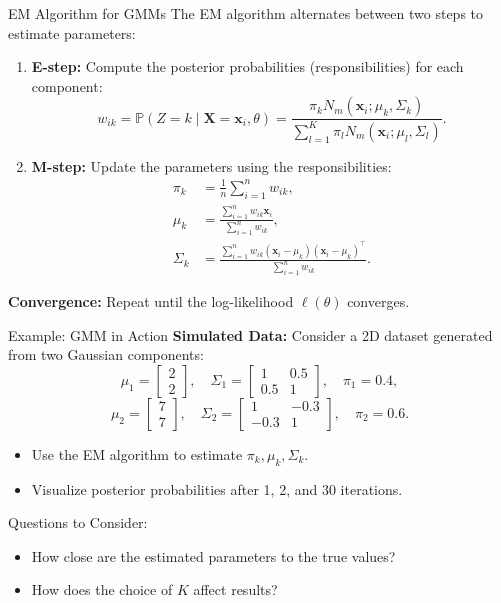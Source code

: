 \documentclass[11pt,handout,aspectratio=169]{beamer}
\begin{document}
\begin{frame}{EM Algorithm for GMMs}
The EM algorithm alternates between two steps to estimate parameters:
\begin{enumerate}
    \item \textbf{E-step:} Compute the posterior probabilities (responsibilities) for each component:
    \[
    w_{ik} = \mathbb{P}(Z = k \mid \mathbf{X} = \mathbf{x}_i, \theta) = 
    \frac{\pi_k N_m(\mathbf{x}_i; \mu_k, \Sigma_k)}{\sum_{l=1}^K \pi_l N_m(\mathbf{x}_i; \mu_l, \Sigma_l)}.
    \]

    \item \textbf{M-step:} Update the parameters using the responsibilities:
    \begin{align*}
        \pi_k &= \frac{1}{n} \sum_{i=1}^n w_{ik}, \\
        \mu_k &= \frac{\sum_{i=1}^n w_{ik} \mathbf{x}_i}{\sum_{i=1}^n w_{ik}}, \\
        \Sigma_k &= \frac{\sum_{i=1}^n w_{ik} (\mathbf{x}_i - \mu_k)(\mathbf{x}_i - \mu_k)^\top}{\sum_{i=1}^n w_{ik}}.
    \end{align*}
\end{enumerate}

\textbf{Convergence:} Repeat until the log-likelihood \( \ell(\theta) \) converges.
\end{frame}

\begin{frame}{Example: GMM in Action}
\textbf{Simulated Data:} Consider a 2D dataset generated from two Gaussian components:
\[
\mu_1 = \begin{bmatrix} 2 \\ 2 \end{bmatrix}, \quad
\Sigma_1 = \begin{bmatrix} 1 & 0.5 \\ 0.5 & 1 \end{bmatrix}, \quad
\pi_1 = 0.4,
\]
\[
\mu_2 = \begin{bmatrix} 7 \\ 7 \end{bmatrix}, \quad
\Sigma_2 = \begin{bmatrix} 1 & -0.3 \\ -0.3 & 1 \end{bmatrix}, \quad
\pi_2 = 0.6.
\]

\begin{itemize}
    \item Use the EM algorithm to estimate \( \pi_k, \mu_k, \Sigma_k \).
    \item Visualize posterior probabilities after 1, 2, and 30 iterations.
\end{itemize}

\begin{alertblock}{Questions to Consider:}
    \begin{itemize}
        \item How close are the estimated parameters to the true values?
        \item How does the choice of \( K \) affect results?
    \end{itemize}
\end{alertblock}
\end{frame}
\end{document}
